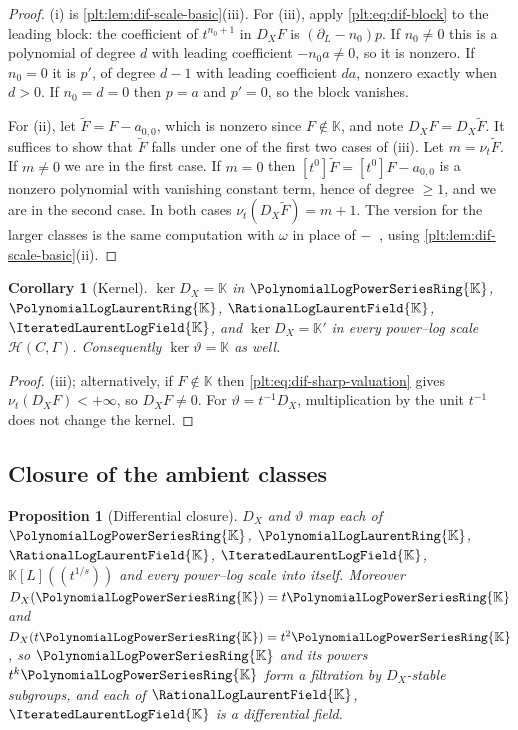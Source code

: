 \documentclass[11pt,oneside]{article}
\theoremstyle{plain}
\newtheorem{proposition}[theorem]{Proposition}
\newtheorem{corollary}[theorem]{Corollary}
\theoremstyle{definition}
\theoremstyle{remark}
\newcommand{\K}{\mathbb{K}}
\newcommand{\PLpow}{\PolynomialLogPowerSeriesRing{\K}}   %
\newcommand{\PLlau}{\PolynomialLogLaurentRing{\K}}       %
\newcommand{\PLrat}{\RationalLogLaurentField{\K}}        %
\newcommand{\PLit}{\IteratedLaurentLogField{\K}}         %
\newcommand{\ordt}{\nu_{t}}                              %
\DeclareMathOperator{\degL}{deg_{L}}
\newcommand{\DX}{D_{X}}                                  %
\newcommand{\EulerOp}{\vartheta}                         %
\begin{document}
\begin{proof}
(i) is \cref{plt:lem:dif-scale-basic}(iii).  For (iii), apply
\cref{plt:eq:dif-block} to the leading block: the coefficient of
\(t^{n_{0}+1}\) in \(\DX F\) is \((\partial_{L}-n_{0})p\).  If \(n_{0}\ne0\)
this is a polynomial of degree \(d\) with leading coefficient \(-n_{0}a\ne0\),
so it is nonzero.  If \(n_{0}=0\) it is \(p'\), of degree \(d-1\) with leading
coefficient \(da\), nonzero exactly when \(d>0\).  If \(n_{0}=d=0\) then
\(p=a\) and \(p'=0\), so the block vanishes.

For (ii), let \(\widetilde F=F-a_{0,0}\), which is nonzero since
\(F\notin\K\), and note \(\DX F=\DX\widetilde F\).  It suffices to show that
\(\widetilde F\) falls under one of the first two cases of (iii).  Let
\(m=\ordt\widetilde F\).  If \(m\ne0\) we are in the first case.  If \(m=0\)
then \([t^{0}]\widetilde F=[t^{0}]F-a_{0,0}\) is a nonzero polynomial with
vanishing constant term, hence of degree \(\ge1\), and we are in the second
case.  In both cases \(\ordt(\DX\widetilde F)=m+1\).  The version for the
larger classes is the same computation with \(\omega\) in place of
\(-\degL\), using \cref{plt:lem:dif-scale-basic}(ii).
\end{proof}

\begin{corollary}[Kernel]\label{plt:cor:dif-kernel}
\(\ker\DX=\K\) in \(\PLpow\), \(\PLlau\), \(\PLrat\), \(\PLit\), and
\(\ker\DX=\K'\) in every power--log scale \(\mathcal H(C,\Gamma)\).
Consequently \(\ker\EulerOp=\K\) as well.
\end{corollary}

\begin{proof}
(iii); alternatively, if \(F\notin\K\) then
\cref{plt:eq:dif-sharp-valuation} gives \(\ordt(\DX F)<+\infty\), so
\(\DX F\ne0\).  For \(\EulerOp=t^{-1}\DX\), multiplication by the unit
\(t^{-1}\) does not change the kernel.
\end{proof}

\subsection{Closure of the ambient classes}
\label{plt:sec:dif-closure}

\begin{proposition}[Differential closure]\label{plt:prop:dif-closure-classes}
\(\DX\) and \(\EulerOp\) map each of \(\PLpow\), \(\PLlau\), \(\PLrat\),
\(\PLit\), \(\K[L]((t^{1/s}))\) and every power--log scale into itself.
Moreover \(\DX(\PLpow)= t\PLpow\) and \(\DX(t\PLpow)=t^{2}\PLpow\), so
\(\PLpow\) and its powers \(t^{k}\PLpow\) form a filtration by
\(\DX\)-stable subgroups, and each of \(\PLrat\), \(\PLit\) is a differential
field.
\end{proposition}
\end{document}
